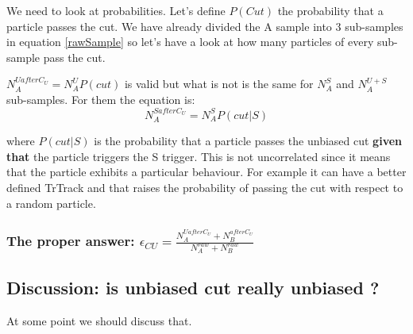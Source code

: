 \documentclass[fleqn,twoside]{article}
\begin{document}
We need to look at probabilities. Let's define $P(Cut)$ the probability that a particle passes the cut.
We have already divided the A sample into 3 sub-samples in equation \ref{rawSample} so let's have a look at how many particles of every sub-sample pass the cut.

$N_{A}^{U after C_{U}} = N_{A}^{U} P(cut)$ is valid but what is not is the same for $N_{A}^{S}$ and $N_{A}^{U+S}$ sub-samples.
For them the equation is:
\begin{equation}
  N_{A}^{S after C_{U}} = N_{A}^{S} P(cut|S)
\end{equation}

where $P(cut|S)$ is the probability that a particle passes the unbiased cut \textbf{given that} the particle triggers the S trigger. This is not uncorrelated since it means that the particle exhibits a particular behaviour. For example it can have a better defined TrTrack and that raises the probability of passing the cut with respect to a random particle.

\subsubsection{The proper answer: $\epsilon_{CU} = \frac{N_{A}^{U after C_{U}} + N_{B}^{after C_{U}}}{N_{A}^{raw} + N_{B}^{raw}}$}

\subsection{Discussion: is unbiased cut really unbiased ?}
At some point we should discuss that.


\begin{thebibliography}{99}

\end{thebibliography}
\end{document}
